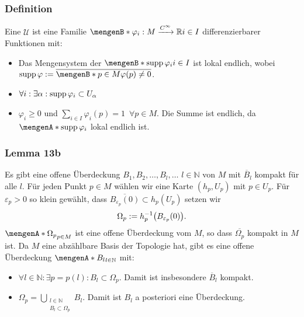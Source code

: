 \subsubsection{Definition} %
\label{ssub:312}
Eine $\mathcal{U}$  ist eine Familie $\set[\varphi_i : M \xrightarrow{C^\infty} \mathds{R}]{i \in I} $ differenzierbarer Funktionen
mit:
\begin{itemize}
	\item Das Mengensystem der  $\set[\supp \varphi_i]{i \in I} $ ist lokal endlich, wobei $\supp \varphi := \overline{\set[p \in M]{\varphi(p) \not= 0}}$.
	\item $\forall i : \exists \alpha : \operatorname{supp} \varphi_i \subset U_\alpha$
	\item $\varphi_i \ge 0$ und $\sum_{i \in I} \varphi_i(p) = 1 \enspace \forall p \in M$. Die Summe ist endlich, da $\set{\supp \varphi_i}$ lokal endlich ist.
\end{itemize}

\subsubsection{Lemma 13b} %
\label{ssub:313}
Es gibt eine offene Überdeckung $B_1, B_2, \ldots , B_l , \ldots $ $l \in \mathds{N}$ von $M$ mit $\overline{B}_l$ kompakt für alle $l$.
Für jeden Punkt $p \in M$ wählen wir eine Karte $(h_p,U_p)$ mit $p \in U_p$. Für $\varepsilon_p >0$ so klein gewählt, dass 
\(
	\overline{B_{\varepsilon_p}(0)} \subset h_p(U_p)
\)
setzen wir 
\[
	\Omega_p := h_p ^{-1} \enbrace*{B_{\varepsilon_p}(0)}.
\]
$\set{\Omega_p}_{p \in M}$ ist eine offene Überdeckung vom $M$, so dass $\overline{\Omega_p}$ kompakt in $M$ ist. Da $M$ eine abzählbare Basis der Topologie hat, gibt es 
eine offene Überdeckung $\set{B_l}_{l \in \mathds{N}}$ mit:
\begin{itemize}
	\item $\forall l \in \mathds{N} : \exists p=p(l) : B_l \subset \Omega_p$. Damit ist insbesondere $\overline{B}_l$ kompakt.
	\item $\Omega_p = \bigcup_{\substack{l \in \mathds{N} \\ B_l \subset \Omega_p}} B_l$. Damit ist $B_l$ a posteriori eine Überdeckung. \bewende
\end{itemize}

